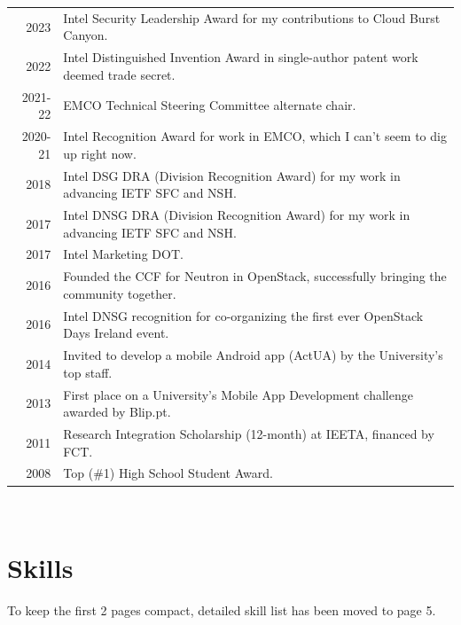 \documentclass[letter,10pt]{article} %
\begin{document}
\begin{tabular}{rl}
	\textsc{2023} & Intel Security Leadership Award for my contributions to Cloud Burst Canyon. \normalsize\\
	\textsc{2022} & Intel Distinguished Invention Award in single-author patent work deemed trade secret. \normalsize\\
	\textsc{2021-22} & EMCO Technical Steering Committee alternate chair.\normalsize\\
	\textsc{2020-21} & Intel Recognition Award for work in EMCO, which I can't seem to dig up right now.\normalsize\\
	\textsc{2018} & Intel DSG DRA (Division Recognition Award) for my work in advancing IETF SFC and NSH. \normalsize\\
	\textsc{2017} & Intel DNSG DRA (Division Recognition Award) for my work in advancing IETF SFC and NSH. \normalsize\\
	\textsc{2017} & Intel Marketing DOT. \normalsize\\
	\textsc{2016} & Founded the CCF for Neutron in OpenStack, successfully bringing the community together. \normalsize\\
	\textsc{2016} & Intel DNSG recognition for co-organizing the first ever OpenStack Days Ireland event. \normalsize\\
	\textsc{2014} & Invited to develop a mobile Android app (ActUA) by the University's top staff. \normalsize\\
	\textsc{2013} & First place on a University's Mobile App Development challenge awarded by Blip.pt. \normalsize\\
	\textsc{2011} & Research Integration Scholarship (12-month) at IEETA, financed by FCT. \normalsize\\
	\textsc{2008} & Top (\#1) High School Student Award. \normalsize\\
\end{tabular} \\

%	


\section{Skills}

To keep the first 2 pages compact, detailed skill list has been moved to page 5.

\end{document}
